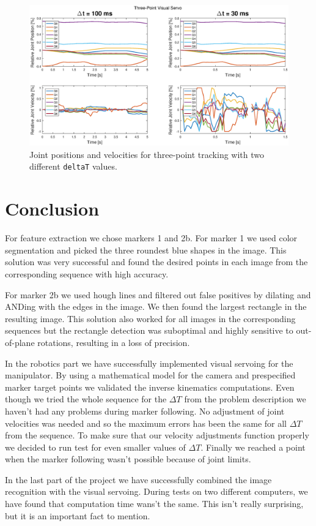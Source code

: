 \documentclass[]{scrartcl}
\begin{document}
\begin{figure}
	\centering
	\includegraphics[width=1\linewidth, trim = 75 0 75 0]{fig/threept.eps}
	\caption{Joint positions and velocities for three-point tracking with two different \texttt{deltaT} values.}
	\label{fig:threept}
\end{figure}
\clearpage
\section{Conclusion}
For feature extraction we chose markers 1 and 2b. For marker 1 we used color segmentation and picked the three roundest blue shapes in the image. This solution was very successful and found the desired points in each image from the corresponding sequence with high accuracy.\par
For marker 2b we used hough lines and filtered out false positives by dilating and ANDing with the edges in the image. We then found the largest rectangle in the resulting image. This solution also worked for all images in the corresponding sequences but the rectangle detection was suboptimal and highly sensitive to out-of-plane rotations, resulting in a loss of precision.\par
In the robotics part we have successfully implemented visual servoing for the manipulator. By using a mathematical model for the camera and prespecified marker target points we validated the inverse kinematics computations. Even though we tried the whole sequence for the $\Delta T$ from the problem description we haven't had any problems during marker following. No adjustment of joint velocities was needed and so the maximum errors has been the same for all $\Delta T$ from the sequence. To make sure that our velocity adjustments function properly we decided to run test for even smaller values of $\Delta T$. Finally we reached a point when the marker following wasn't possible because of joint limits.\par
In the last part of the project we have successfully combined the image recognition with the visual servoing. During tests on two different computers, we have found that computation time wans't the same. This isn't really surprising, but it is an important fact to mention.  

\clearpage


\end{document}
